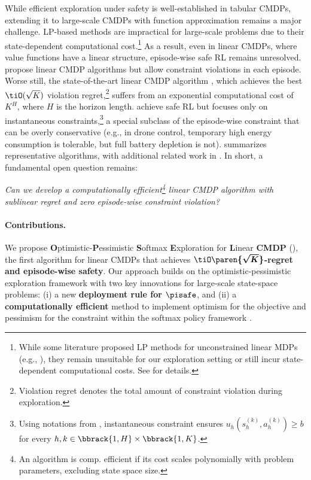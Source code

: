While efficient exploration under safety is well-established in tabular CMDPs, extending it to large-scale CMDPs with function approximation remains a major challenge.
LP-based methods are impractical for large-scale problems due to their state-dependent computational cost.\footnote{While some literature proposed LP methods for unconstrained linear MDPs (e.g., \citet{neu2023efficient}), they remain unsuitable for our exploration setting or still incur state-dependent computational costs.
See  for details.} 
As a result, even in linear CMDPs, where value functions have a linear structure, episode-wise safe RL remains unresolved. 
\citet{ghosh2022provably,ghosh2024towards,yang2022reduction,wei2024safe} propose linear CMDP algorithms but allow constraint violations in each episode.
Worse still, the state-of-the-art linear CMDP algorithm \citep{ghosh2024towards}, which achieves the best $\tiO(\sqrt{K})$ violation regret,\footnote{Violation regret denotes the total amount of constraint violation during exploration.} suffers from an exponential computational cost of $K^H$, where $H$ is the horizon length.
\citet{amani2021safe} achieve safe RL but focuses only on instantaneous constraints,\footnote{Using notations from , instantaneous constraint ensures $u_h(s^{(k)}_h, a^{(k)}_h) \geq b$ for every $h, k \in \bbrack{1,H}\times\bbrack{1,K}$.} a special subclass of the episode-wise constraint that can be overly conservative (e.g., in drone control, temporary high energy consumption is tolerable, but full battery depletion is not).
 summarizes representative algorithms, with additional related work in .
In short, a fundamental open question remains:
\begin{center}
\emph{Can we develop a computationally efficient\footnote{An algorithm is comp. efficient if its cost scales polynomially with problem parameters, excluding state space size.} linear CMDP algorithm with \\sublinear regret and zero episode-wise constraint violation?}
\end{center}

\paragraph{Contributions.}
We propose \textbf{O}ptimistic-\textbf{P}essimistic \textbf{S}oftmax \textbf{E}xploration for \textbf{L}inear \textbf{CMDP} (\MDPalgo), the first algorithm for linear CMDPs that achieves \textbf{\(\boldsymbol{\tiO\paren{\sqrt{K}}}\)-regret and episode-wise safety}.
Our approach builds on the optimistic-pessimistic exploration framework with two key innovations for large-scale state-space problems:
($\mathrm{i}$) a new \textbf{deployment rule for $\boldsymbol{\pisafe}$},
and ($\mathrm{ii}$) a \textbf{computationally efficient} method to implement optimism for the objective and pessimism for the constraint within the softmax policy framework \citep{ghosh2022provably,ghosh2024towards}.

